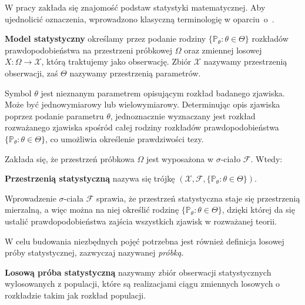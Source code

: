 W pracy zakłada się znajomość podstaw statystyki matematycznej. Aby ujednolicić oznaczenia, wprowadzono klasyczną terminologię w oparciu~o~\cite{niemiro}.

\begin{definition}
\textbf{Model statystyczny} określamy przez podanie rodziny $\{ \mathbb P_{\theta}:\theta\in\Theta\} $ rozkładów prawdopodobieństwa na przestrzeni próbkowej $\Omega$ oraz zmiennej losowej $X : \Omega \rightarrow \mathcal{X}$, którą traktujemy jako obserwację. Zbiór $\mathcal{X}$ nazywamy przestrzenią obserwacji, zaś $\Theta$ nazywamy przestrzenią parametrów. \\
\end{definition}
Symbol $\theta$ jest nieznanym parametrem opisującym rozkład badanego zjawiska. Może być jednowymiarowy lub wielowymiarowy. Determinując opis zjawiska poprzez podanie parametru $\theta$, jednoznacznie wyznaczany jest rozkład rozważanego zjawiska spośród całej rodziny rozkładów prawdopodobieństwa $\{ \mathbb P_{\theta}:\theta\in\Theta\}$, co umożliwia określenie prawdziwości tezy.
\par
Zakłada się, że przestrzeń próbkowa $\Omega$ jest wyposażona w $\sigma$-ciało $\mathcal{F}$. Wtedy:
\begin{definition}
\textbf{Przestrzenią statystyczną} nazywa się trójkę $(\mathcal{X},\mathcal{F},\{\mathbb P_{\theta}:\theta\in\Theta\})$.
\end{definition}
Wprowadzenie $\sigma$-ciała $\mathcal{F}$ sprawia, że przestrzeń statystyczna staje się przestrzenią mierzalną, a więc można na niej określić rodzinę $\{ \mathbb P_{\theta}:\theta\in\Theta\} $, dzięki której da się ustalić prawdopodobieństwa zajścia wszystkich zjawisk w rozważanej teorii.

W celu budowania niezbędnych pojęć potrzebna jest również definicja losowej próby statystycznej, zazwyczaj nazywanej \textit{próbką}.

\begin{definition}
 \textbf{Losową próba statystyczną} nazywamy zbiór obserwacji statystycznych wylosowanych z populacji, które są realizacjami ciągu zmiennych losowych o rozkładzie takim jak rozkład populacji.
 \end{definition}
